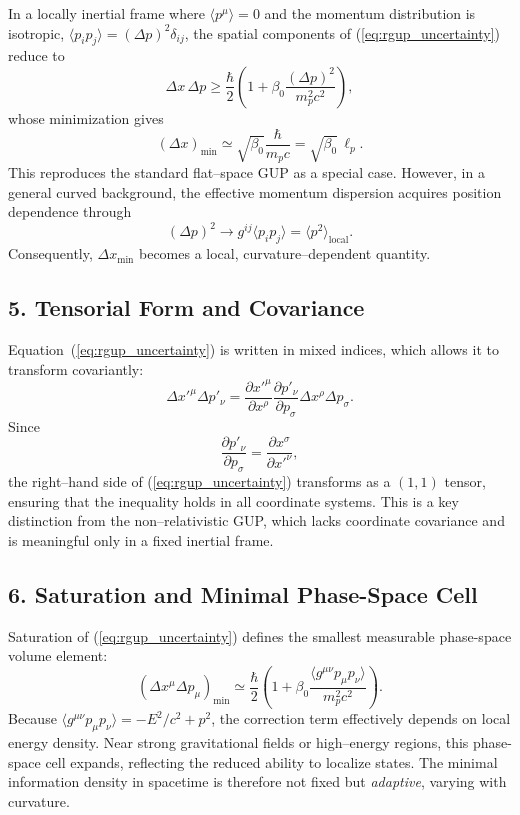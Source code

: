 \documentclass[11pt,oneside]{book}
\numberwithin{equation}{chapter}
\newcommand{\lp}{\ell_p}             %
\newcommand{\mpx}{m_p}               %
\newcommand{\betaz}{\beta_0}
\begin{document}
In a locally inertial frame where
$\langle p^\mu\rangle=0$ and the momentum distribution is isotropic,
$\langle p_i p_j\rangle=(\Delta p)^2\delta_{ij}$,
the spatial components of (\ref{eq:rgup_uncertainty}) reduce to
\begin{equation}
\Delta x\,\Delta p
\ge
\frac{\hbar}{2}
\left(
1+\betaz\frac{(\Delta p)^2}{\mpx^2 c^2}
\right),
\end{equation}
whose minimization gives
\begin{equation}
(\Delta x)_{\min}
\simeq
\sqrt{\betaz}\frac{\hbar}{\mpx c}
=\sqrt{\betaz}\,\lp.
\end{equation}
This reproduces the standard flat--space GUP as a special case.
However, in a general curved background,
the effective momentum dispersion acquires position dependence through
\begin{equation}
(\Delta p)^2 \to g^{ij}\langle p_i p_j\rangle
= \langle p^2\rangle_{\text{local}}.
\end{equation}
Consequently, $\Delta x_{\min}$ becomes a local, curvature--dependent quantity.

\subsection*{5. Tensorial Form and Covariance}

Equation~(\ref{eq:rgup_uncertainty}) is written in mixed indices,
which allows it to transform covariantly:
\begin{equation}
\Delta x'^{\mu}\Delta p'_{\nu}
=
\frac{\partial x'^{\mu}}{\partial x^{\rho}}
\frac{\partial p'_{\nu}}{\partial p_{\sigma}}
\Delta x^{\rho}\Delta p_{\sigma}.
\end{equation}
Since
\begin{equation}
\frac{\partial p'_{\nu}}{\partial p_{\sigma}}
=\frac{\partial x^{\sigma}}{\partial x'^{\nu}},
\end{equation}
the right--hand side of (\ref{eq:rgup_uncertainty})
transforms as a $(1,1)$ tensor, ensuring that the inequality holds in all
coordinate systems.
This is a key distinction from the non--relativistic GUP, which lacks
coordinate covariance and is meaningful only in a fixed inertial frame.

\subsection*{6. Saturation and Minimal Phase-Space Cell}

Saturation of (\ref{eq:rgup_uncertainty}) defines the smallest measurable
phase-space volume element:
\begin{equation}
(\Delta x^\mu \Delta p_\mu)_{\min}
\simeq
\frac{\hbar}{2}
\left(
1+\betaz\frac{\langle g^{\mu\nu}p_\mu p_\nu\rangle}{\mpx^2 c^2}
\right).
\end{equation}
Because $\langle g^{\mu\nu}p_\mu p_\nu\rangle=-E^2/c^2+p^2$,
the correction term effectively depends on local energy density.
Near strong gravitational fields or high--energy regions, this phase-space
cell expands, reflecting the reduced ability to localize states.
The minimal information density in spacetime is therefore not fixed but
\emph{adaptive}, varying with curvature.
\end{document}
